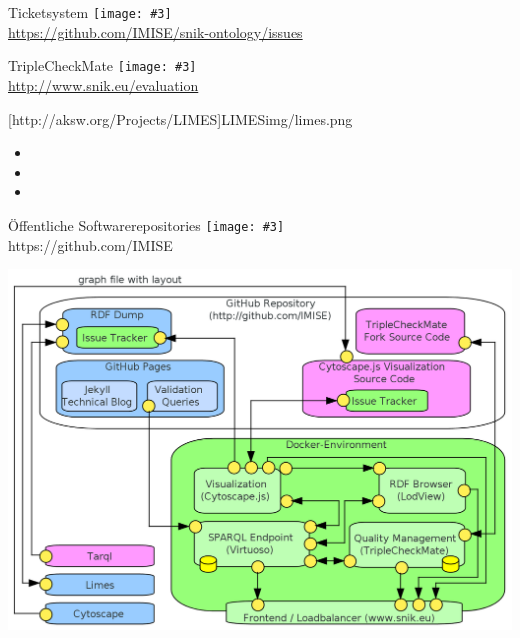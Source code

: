 \documentclass{beamer}
\newcommand{\imageslide}[4][]
{
\begin{frame}{#2}
\centering\texttt{[image: \#3]}
\\#1
\note{#4}
\end{frame}
}
\begin{document}
\imageslide[\url{https://github.com/IMISE/snik-ontology/issues}]{Ticketsystem}{img/gitissue.png}{
\begin{itemize}
\item 
\item 
\item 
\end{itemize}
}

\imageslide[\url{http://www.snik.eu/evaluation}]{TripleCheckMate}{img/triplecheckmate.png}

\imageslide[http://aksw.org/Projects/LIMES]{LIMES}{img/limes.png}{
\begin{itemize}
\item 
\item 
\item 
\end{itemize}
}

\imageslide[https://github.com/IMISE]{Öffentliche Softwarerepositories}{img/github.png}{
\begin{itemize}
\item 
\item 
\item 
\end{itemize}
}


\begin{frame}
\includegraphics[width=\textwidth]{img/architecture.png}
\end{frame}
\end{document}
